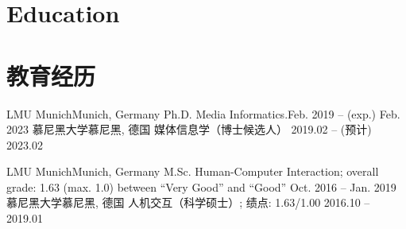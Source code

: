 
 {
  \section{\textbf{Education}}
}{
  \section{\textbf{教育经历}}
}


  \resumeSubHeadingListStartNoLabel
  \small

 {
  \resumeSubheading
    {LMU Munich}{Munich, Germany}
    {Ph.D. Media Informatics.}{Feb. 2019 -- (exp.) Feb. 2023}
}{
  \resumeSubheading
    {慕尼黑大学}{慕尼黑, 德国}
    {媒体信息学（博士候选人）
    }{2019.02 -- (预计) 2023.02}
}

 {
  \resumeSubheading
    {LMU Munich}{Munich, Germany}
    {M.Sc. Human-Computer Interaction; overall grade: 1.63 (max. 1.0) between ``Very Good'' and ``Good''
  }{Oct. 2016 -- Jan. 2019}
}{
  \resumeSubheading
  {慕尼黑大学}{慕尼黑, 德国}
  {人机交互（科学硕士）; 绩点: 1.63/1.00
}{2016.10 -- 2019.01}
}

